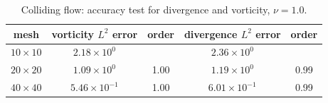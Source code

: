 \documentclass[a4paper, 11pt]{article}
\begin{document}
          \begin{table}[!htbp]
            \centering
            \begin{tabular}{ccccc} \toprule
              mesh   & vorticity $L^2$ error & order & divergence
              $L^2$ error & order\\ \midrule
              $10 \times 10$    &   $2.18 \times 10^{0}$   &  &   $2.36 \times
              10^0$ &  \\
              $20 \times 20 $   &   $1.09 \times 10^{0}$  & 1.00 &   $1.19 \times
              10^0$ & 0.99 \\
              $40 \times 40 $   &   $5.46 \times 10^{-1}$ & 1.00 &   $6.01 \times
              10^{-1}$ &  0.99 \\ \bottomrule
            \end{tabular}
            \caption{\small Colliding flow: accuracy test for
              divergence and vorticity, $\nu = 1.0$.}

            \label{tab::colliding_moving_div_error}
          \end{table}
\end{document}
